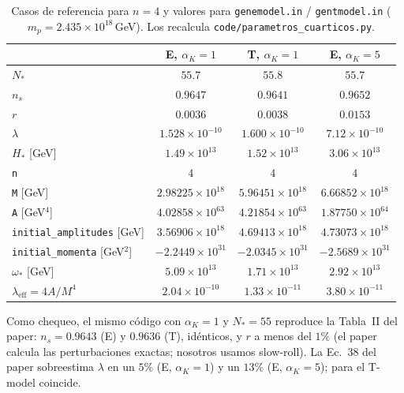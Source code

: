 \documentclass[11pt]{article}
\begin{document}
            \begin{table}[H]
                \centering
                \begin{tabular}{lccc}
                    \toprule
                    & E, $\alpha_K = 1$ & T, $\alpha_K = 1$ & E, $\alpha_K = 5$ \\
                    \midrule
                    $N_*$ & $55.7$ & $55.8$ & $55.7$ \\
                    $n_s$ & $0.9647$ & $0.9641$ & $0.9652$ \\
                    $r$ & $0.0036$ & $0.0038$ & $0.0153$ \\
                    $\lambda$ & $1.528 \times 10^{-10}$ & $1.600 \times 10^{-10}$ & $7.12 \times 10^{-10}$ \\
                    $H_*$ [GeV] & $1.49 \times 10^{13}$ & $1.52 \times 10^{13}$ & $3.06 \times 10^{13}$ \\
                    \midrule
                    \texttt{n} & $4$ & $4$ & $4$ \\
                    \texttt{M} [GeV] & $2.98225 \times 10^{18}$ & $5.96451 \times 10^{18}$ & $6.66852 \times 10^{18}$ \\
                    \texttt{A} [GeV$^4$] & $4.02858 \times 10^{63}$ & $4.21854 \times 10^{63}$ & $1.87750 \times 10^{64}$ \\
                    \texttt{initial\_amplitudes} [GeV] & $3.56906 \times 10^{18}$ & $4.69413 \times 10^{18}$ & $4.73073 \times 10^{18}$ \\
                    \texttt{initial\_momenta} [GeV$^2$] & $-2.2449 \times 10^{31}$ & $-2.0345 \times 10^{31}$ & $-2.5689 \times 10^{31}$ \\
                    $\omega_*$ [GeV] & $5.09 \times 10^{13}$ & $1.71 \times 10^{13}$ & $2.92 \times 10^{13}$ \\
                    $\lambda_{\text{eff}} = 4A/M^4$ & $2.04 \times 10^{-10}$ & $1.33 \times 10^{-11}$ & $3.80 \times 10^{-11}$ \\
                    \bottomrule
                \end{tabular}
                \caption{Casos de referencia para $n = 4$ y valores para \texttt{genemodel.in} / \texttt{gentmodel.in} ($m_p = 2.435 \times 10^{18}$\,GeV). Los recalcula \texttt{code/parametros\_cuarticos.py}.}
                \label{tab:parametros-cuarticos}
            \end{table}

            Como chequeo, el mismo código con $\alpha_K = 1$ y $N_* = 55$ reproduce la Tabla~II del paper: $n_s = 0.9643$ (E) y $0.9636$ (T), idénticos, y $r$ a menos del $1\%$ (el paper calcula las perturbaciones exactas; nosotros usamos slow-roll). La Ec.~38 del paper sobreestima $\lambda$ en un $5\%$ (E, $\alpha_K = 1$) y un $13\%$ (E, $\alpha_K = 5$); para el T-model coincide.
\end{document}
